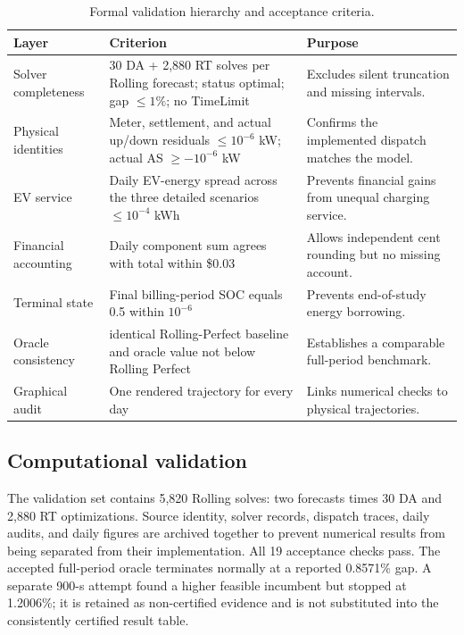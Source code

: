 \documentclass[final,5p,times]{elsarticle}
\begin{document}
\begin{table}[!t]
\centering
\caption{Formal validation hierarchy and acceptance criteria.}
\label{tab:validation_protocol}
\scriptsize
\begin{tabularx}{\textwidth}{@{}p{}p{}X@{}}
\toprule
Layer & Criterion & Purpose \\
\midrule
Solver completeness & 30 DA + 2,880 RT solves per Rolling forecast; status optimal; gap $\le1\%$; no TimeLimit & Excludes silent truncation and missing intervals.\\
Physical identities & Meter, settlement, and actual up/down residuals $\le10^{-6}$ kW; actual AS $\ge-10^{-6}$ kW & Confirms the implemented dispatch matches the model.\\
EV service & Daily EV-energy spread across the three detailed scenarios $\le10^{-4}$ kWh & Prevents financial gains from unequal charging service.\\
Financial accounting & Daily component sum agrees with total within \$0.03 & Allows independent cent rounding but no missing account.\\
Terminal state & Final billing-period SOC equals 0.5 within $10^{-6}$ & Prevents end-of-study energy borrowing.\\
Oracle consistency & identical Rolling-Perfect baseline and oracle value not below Rolling Perfect & Establishes a comparable full-period benchmark.\\
Graphical audit & One rendered trajectory for every day & Links numerical checks to physical trajectories.\\
\bottomrule
\end{tabularx}
\end{table}

\subsection{Computational validation}
The validation set contains 5,820 Rolling solves: two forecasts times 30 DA and
2,880 RT optimizations. Source identity, solver records, dispatch traces, daily
audits, and daily figures are archived together to prevent numerical results
from being separated from their implementation. All 19 acceptance checks pass.
The accepted full-period oracle terminates normally at a reported 0.8571\%
gap. A separate 900-s attempt found a higher feasible incumbent but stopped at
1.2006\%; it is retained as non-certified evidence and is not substituted into
the consistently certified result table.
\end{document}
